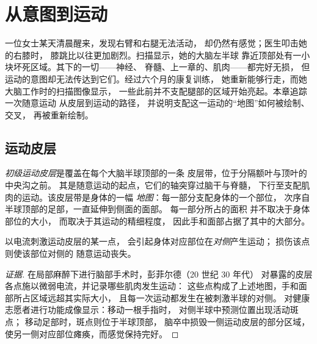 \chapter{从意图到运动}\label{ch:g12:brain-and-movement}

一位女士某天清晨醒来，发现右臂和右腿无法活动，
却仍然有感觉；医生叩击她的右膝时，
膝跳比以往更加剧烈。扫描显示，她的大脑左半球
靠近顶部处有一小块坏死区域。其下的一切——神经、
脊髓、上一章的、肌肉——都完好无损，
但运动的意图却无法传达到它们。经过六个月的康复训练，
她重新能够行走，而她大脑工作时的扫描图像显示，
一些此前并不支配腿部的区域开始亮起。本章追踪一次随意运动
从皮层到运动的路径，
并说明支配这一运动的“地图”如何被绘制、交叉，
再被重新绘制。

\section{运动皮层}

\begin{definition}[运动皮层]\label{def:g12:brain-and-movement:cortex}
\emph{初级运动皮层}是覆盖在每个大脑半球顶部的一条
皮层带，位于分隔额叶与顶叶的中央沟之前。
其是随意运动的起点，它们的轴突穿过脑干与脊髓，
下行至支配肌肉的运动。该皮层带是身体的一幅
\emph{地图}：每一部分支配身体的一个部位，
次序自半球顶部的足部，一直延伸到侧面的面部。
每一部分所占的面积
并不取决于身体部位的大小，
而取决于其运动的精细程度，
因此手和面部占据了其中的大部分。
\end{definition}

\begin{proposition}\label{prop:g12:brain-and-movement:map}
以电流刺激运动皮层的某一点，
会引起身体对应部位在\emph{对侧}产生运动；
损伤该点则使该部位对侧的
随意运动丧失。
\end{proposition}
\begin{proof}[证据]
在局部麻醉下进行脑部手术时，彭菲尔德（20 世纪 30 年代）
对暴露的皮层各点施以微弱电流，并记录哪些肌肉发生运动：
这些点构成了上述地图，手和面部所占区域远超其实际大小，
且每一次运动都发生在被刺激半球的对侧。
对健康志愿者进行功能成像显示：移动一根手指时，
对侧半球中预测位置出现活动斑点；
移动足部时，斑点则位于半球顶部，
脑卒中损毁一侧运动皮层的部分区域，
使另一侧对应部位瘫痪，而感觉保持完好。
\end{proof}

